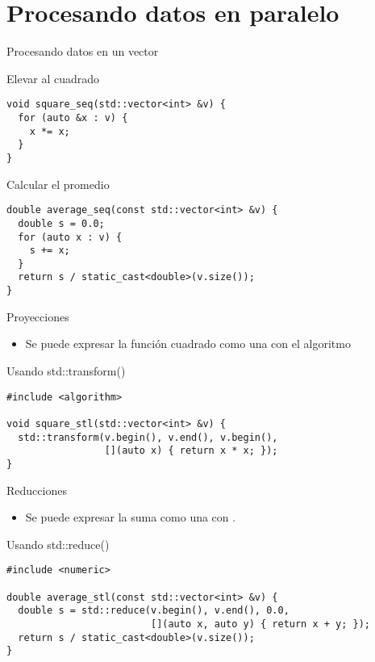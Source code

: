 \section{Procesando datos en paralelo}

\begin{frame}[t,fragile]{Procesando datos en un vector}
\begin{block}{Elevar al cuadrado}
\begin{lstlisting}
void square_seq(std::vector<int> &v) {
  for (auto &x : v) {
    x *= x;
  }
}
\end{lstlisting}
\end{block}

\begin{block}{Calcular el promedio}
\begin{lstlisting}
double average_seq(const std::vector<int> &v) {
  double s = 0.0;
  for (auto x : v) {
    s += x;
  }
  return s / static_cast<double>(v.size());
}
\end{lstlisting}
\end{block}
\end{frame}

\begin{frame}[t,fragile]{Proyecciones}
\begin{itemize}
  \item Se puede expresar la función cuadrado como una 
        con el algoritmo 
\end{itemize}

\begin{block}{Usando std::transform()}
\begin{lstlisting}
#include <algorithm>

void square_stl(std::vector<int> &v) {
  std::transform(v.begin(), v.end(), v.begin(),
                 [](auto x) { return x * x; });
}
\end{lstlisting}
\end{block}
\end{frame}

\begin{frame}[t,fragile]{Reducciones}
\begin{itemize}
  \item Se puede expresar la suma como una 
        con .
\end{itemize}

\begin{block}{Usando std::reduce()}
\begin{lstlisting}
#include <numeric>

double average_stl(const std::vector<int> &v) {
  double s = std::reduce(v.begin(), v.end(), 0.0,
                         [](auto x, auto y) { return x + y; });
  return s / static_cast<double>(v.size());
}
\end{lstlisting}
\end{block}
\end{frame}

